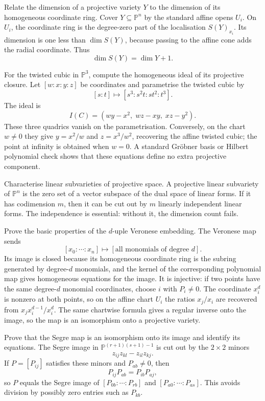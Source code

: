 \documentclass[12pt]{article}
\theoremstyle{plain}
\theoremstyle{definition}
\newcommand{\bb}[1]{\mathbb{#1}}
\begin{document}
\questionpar Relate the dimension of a projective variety $Y$ to the dimension of its homogeneous coordinate ring.
\solutionpar Cover $Y\subseteq\bb P^n$ by the standard affine opens $U_i$. On $U_i$, the coordinate ring is the degree-zero part of the localisation $S(Y)_{x_i}$. Its dimension is one less than $\dim S(Y)$, because passing to the affine cone adds the radial coordinate. Thus
\[
\dim S(Y)=\dim Y+1.
\]

\questionpar For the twisted cubic in $\bb P^3$, compute the homogeneous ideal of its projective closure.
\solutionpar Let $[w:x:y:z]$ be coordinates and parametrise the twisted cubic by
\[
[s:t]\longmapsto [s^3:s^2t:st^2:t^3].
\]
The ideal is
\[
I(C)=(wy-x^2,\; wz-xy,\; xz-y^2).
\]
These three quadrics vanish on the parametrisation. Conversely, on the chart $w\neq0$ they give $y=x^2/w$ and $z=x^3/w^2$, recovering the affine twisted cubic; the point at infinity is obtained when $w=0$. A standard Gr\"obner basis or Hilbert polynomial check shows that these equations define no extra projective component.

\questionpar Characterise linear subvarieties of projective space.
\solutionpar A projective linear subvariety of $\bb P^n$ is the zero set of a vector subspace of the dual space of linear forms. If it has codimension $m$, then it can be cut out by $m$ linearly independent linear forms. The independence is essential: without it, the dimension count fails.

\questionpar Prove the basic properties of the $d$-uple Veronese embedding.
\solutionpar The Veronese map sends
\[
[x_0:\cdots:x_n]\longmapsto [\text{all monomials of degree }d].
\]
Its image is closed because its homogeneous coordinate ring is the subring generated by degree-$d$ monomials, and the kernel of the corresponding polynomial map gives homogeneous equations for the image. It is injective: if two points have the same degree-$d$ monomial coordinates, choose $i$ with $P_i\neq0$. The coordinate $x_i^d$ is nonzero at both points, so on the affine chart $U_i$ the ratios $x_j/x_i$ are recovered from $x_jx_i^{d-1}/x_i^d$. The same chartwise formula gives a regular inverse onto the image, so the map is an isomorphism onto a projective variety.

\questionpar Prove that the Segre map is an isomorphism onto its image and identify its equations.
\solutionpar The Segre image in $\bb P^{(r+1)(s+1)-1}$ is cut out by the $2\times2$ minors
\[
z_{ij}z_{kl}-z_{il}z_{kj}.
\]
If $P=[P_{ij}]$ satisfies these minors and $P_{ab}\neq0$, then
\[
P_{ij}P_{ab}=P_{ib}P_{aj},
\]
so $P$ equals the Segre image of $[P_{0b}:\cdots:P_{rb}]$ and $[P_{a0}:\cdots:P_{as}]$. This avoids division by possibly zero entries such as $P_{kb}$.
\end{document}
